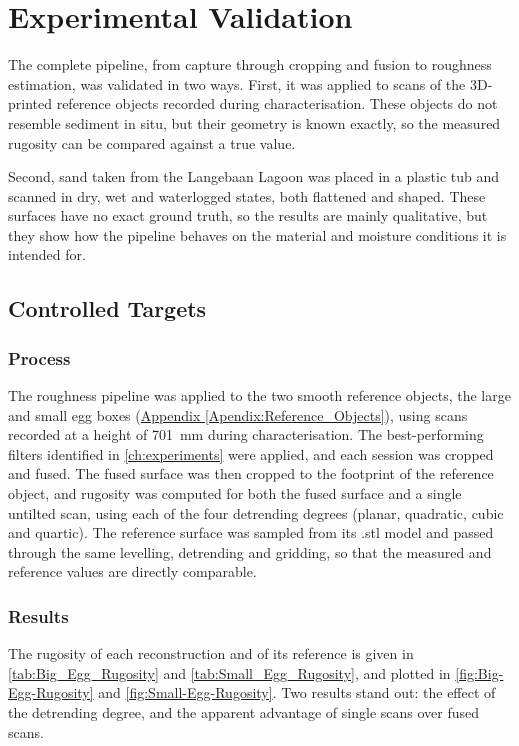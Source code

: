 \chapter{Experimental Validation}
\label{ch:Validation}
The complete pipeline, from capture through cropping and fusion to roughness estimation, was validated in two ways. First, it was applied to scans of the 3D-printed reference objects recorded during characterisation. These objects do not resemble sediment in situ, but their geometry is known exactly, so the measured rugosity can be compared against a true value.

Second, sand taken from the Langebaan Lagoon was placed in a plastic tub and scanned in dry, wet and waterlogged states, both flattened and shaped. These surfaces have no exact ground truth, so the results are mainly qualitative, but they show how the pipeline behaves on the material and moisture conditions it is intended for.

\section{Controlled Targets}

\subsection{Process}
The roughness pipeline was applied to the two smooth reference objects, the large and small egg boxes (\hyperref[Apendix:Reference_Objects]{Appendix \ref*{Apendix:Reference_Objects}}), using scans recorded at a height of 701~mm during characterisation. The best-performing filters identified in \autoref{ch:experiments} were applied, and each session was cropped and fused. The fused surface was then cropped to the footprint of the reference object, and rugosity was computed for both the fused surface and a single untilted scan, using each of the four detrending degrees (planar, quadratic, cubic and quartic). The reference surface was sampled from its .stl model and passed through the same levelling, detrending and gridding, so that the measured and reference values are directly comparable.

\subsection{Results}
The rugosity of each reconstruction and of its reference is given in \autoref{tab:Big_Egg_Rugosity} and \autoref{tab:Small_Egg_Rugosity}, and plotted in \autoref{fig:Big-Egg-Rugosity} and \autoref{fig:Small-Egg-Rugosity}. Two results stand out: the effect of the detrending degree, and the apparent advantage of single scans over fused scans.

